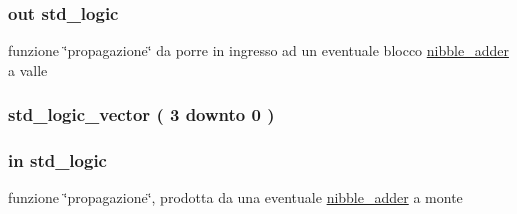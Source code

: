 \subsubsection[{\texorpdfstring{genout}{genout}}]{ {\bfseries \textcolor{vhdlchar}{out}\textcolor{vhdlchar}{ }} {\bfseries \textcolor{vhdlchar}{std\+\_\+logic}\textcolor{vhdlchar}{ }} \hspace{0.3cm}{\ttfamily [Port]}}\hypertarget{group___nibble_adder_ga068cd5c4d23e284cb942702252ed1491}{}\label{group___nibble_adder_ga068cd5c4d23e284cb942702252ed1491}
funzione \char`\"{}propagazione\char`\"{} da porre in ingresso ad un eventuale blocco \hyperlink{classnibble__adder}{nibble\+\_\+adder} a valle 
\subsubsection[{\texorpdfstring{prop}{prop}}]{ {\bfseries \textcolor{vhdlchar}{std\+\_\+logic\+\_\+vector}\textcolor{vhdlchar}{ }\textcolor{vhdlchar}{(}\textcolor{vhdlchar}{ }\textcolor{vhdlchar}{ } \textcolor{vhdldigit}{3} \textcolor{vhdlchar}{ }\textcolor{vhdlchar}{downto}\textcolor{vhdlchar}{ }\textcolor{vhdlchar}{ } \textcolor{vhdldigit}{0} \textcolor{vhdlchar}{ }\textcolor{vhdlchar}{)}\textcolor{vhdlchar}{ }} \hspace{0.3cm}{\ttfamily [Signal]}}\hypertarget{group___nibble_adder_ga3abd8d433ff039baabc0c6fc2126578b}{}\label{group___nibble_adder_ga3abd8d433ff039baabc0c6fc2126578b}
\subsubsection[{\texorpdfstring{propin}{propin}}]{ {\bfseries \textcolor{vhdlchar}{in}\textcolor{vhdlchar}{ }} {\bfseries \textcolor{vhdlchar}{std\+\_\+logic}\textcolor{vhdlchar}{ }} \hspace{0.3cm}{\ttfamily [Port]}}\hypertarget{group___nibble_adder_ga422e8e7ee01fc7ac7b7390cd2ad8c87b}{}\label{group___nibble_adder_ga422e8e7ee01fc7ac7b7390cd2ad8c87b}


funzione \char`\"{}propagazione\char`\"{}, prodotta da una eventuale \hyperlink{classnibble__adder}{nibble\+\_\+adder} a monte 


